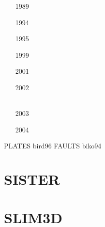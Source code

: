 \begin{small}
\begin{itemize}
\item[1989]
\textcite{bird89}
\item[1994]
\textcite{kobi94} \\
\textcite{biko94}
\item[1995]
\textcite{kobi95}
\item[1999]
\textcite{bili99}
\item[2001]
\textcite{jibf01}\\
\textcite{jift01}
\item[2002]
\textcite{nebs02}\\
\textcite{libi02b}\\
\textcite{libi02}
\item[2003]
\textcite{jine03}
\item[2004]
\textcite{nejv04}
\end{itemize}
\end{small}

PLATES bird96
FAULTS biko94



\section{SISTER}

\begin{small}
\begin{itemize}
\item[\twothousandsixteen]   \textcite{olbm16} 
\item[\twothousandeighteen]  \textcite{weib18}
\item[\twothousandtwentyone] \textcite{haao21}
\end{itemize}
\end{small}

\section{SLIM3D} 

